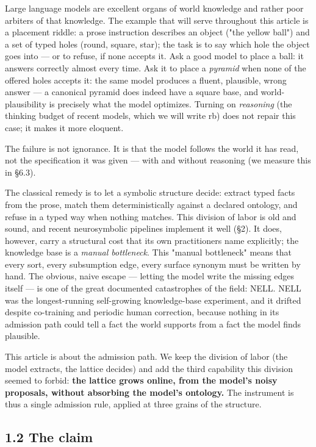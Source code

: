 \documentclass[11pt]{article}
\begin{document}
Large language models are excellent organs of world knowledge and rather poor arbiters of that knowledge. The example that will serve throughout this article is a placement riddle: a prose instruction describes an object ("the yellow ball") and a set of typed holes (round, square, star); the task is to say which hole the object goes into — or to refuse, if none accepts it. Ask a good model to place a ball: it answers correctly almost every time. Ask it to place a \emph{pyramid} when none of the offered holes accepts it: the same model produces a fluent, plausible, wrong answer — a canonical pyramid does indeed have a square base, and world-plausibility is precisely what the model optimizes. Turning on \emph{reasoning} (the thinking budget of recent models, which we will write rb) does not repair this case; it makes it more eloquent.

The failure is not ignorance. It is that the model follows the world it has read, not the specification it was given — with and without reasoning (we measure this in §6.3).

The classical remedy is to let a symbolic structure decide: extract typed facts from the prose, match them deterministically against a declared ontology, and refuse in a typed way when nothing matches. This division of labor is old and sound, and recent neurosymbolic pipelines implement it well (§2). It does, however, carry a structural cost that its own practitioners name explicitly; the knowledge base is a \emph{manual bottleneck}. This "manual bottleneck" means that every sort, every subsumption edge, every surface synonym must be written by hand. The obvious, naive escape — letting the model write the missing edges itself — is one of the great documented catastrophes of the field: NELL. NELL was the longest-running self-growing knowledge-base experiment, and it drifted despite co-training and periodic human correction, because nothing in its admission path could tell a fact the world supports from a fact the model finds plausible.

This article is about the admission path. We keep the division of labor (the model extracts, the lattice decides) and add the third capability this division seemed to forbid: \textbf{the lattice grows online, from the model's noisy proposals, without absorbing the model's ontology.} The instrument is thus a single admission rule, applied at three grains of the structure.

\subsection*{1.2 The claim}
\end{document}
